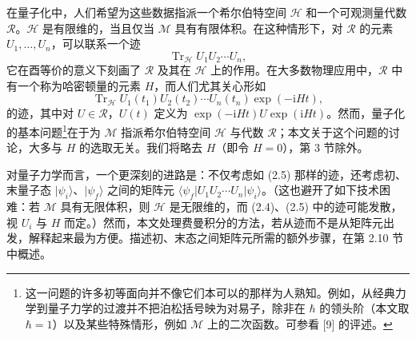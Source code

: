 \documentclass[11pt,a4paper,UTF8]{ctexart}
\theoremstyle{plain}
\theoremstyle{definition}
\begin{document}
在量子化中，人们希望为这些数据指派一个希尔伯特空间 $\mathcal{H}$ 和一个可观测量代数 $\mathcal{R}$。$\mathcal{H}$ 是有限维的，当且仅当 $\mathcal{M}$ 具有有限体积。在这种情形下，对 $\mathcal{R}$ 的元素 $U_1,\dots,U_n$，可以联系一个迹
\begin{equation}
    \operatorname{Tr}_{\mathcal{H}}U_1U_2\cdots U_n,
    \tag{2.4}
\end{equation}
它在酉等价的意义下刻画了 $\mathcal{R}$ 及其在 $\mathcal{H}$ 上的作用。在大多数物理应用中，$\mathcal{R}$ 中有一个称为哈密顿量的元素 $H$，而人们尤其关心形如
\begin{equation}
    \operatorname{Tr}_{\mathcal{H}}U_1(t_1)U_2(t_2)\cdots U_n(t_n)\exp(-\mathrm{i}Ht),
    \tag{2.5}
\end{equation}
的迹，其中对 $U\in\mathcal{R}$，$U(t)$ 定义为 $\exp(-\mathrm{i}Ht)U\exp(\mathrm{i}Ht)$。然而，量子化的基本问题\footnote{这一问题的许多初等面向并不像它们本可以的那样为人熟知。例如，从经典力学到量子力学的过渡并不把泊松括号映为对易子，除非在 $\hbar$ 的领头阶（本文取 $\hbar=1$）以及某些特殊情形，例如 $\mathcal{M}$ 上的二次函数。可参看 [9] 的评述。}在于为 $\mathcal{M}$ 指派希尔伯特空间 $\mathcal{H}$ 与代数 $\mathcal{R}$；本文关于这个问题的讨论，大多与 $H$ 的选取无关。我们将略去 $H$（即令 $H=0$），第 3 节除外。



对量子力学而言，一个更深刻的进路是：不仅考虑如 (2.5) 那样的迹，还考虑初、末量子态 $|\psi_i\rangle$、$|\psi_f\rangle$ 之间的矩阵元 $\langle\psi_f|U_1U_2\cdots U_n|\psi_i\rangle$。（这也避开了如下技术困难：若 $\mathcal{M}$ 具有无限体积，则 $\mathcal{H}$ 是无限维的，而 (2.4)、(2.5) 中的迹可能发散，视 $U_i$ 与 $H$ 而定。）然而，本文处理费曼积分的方法，若从迹而不是从矩阵元出发，解释起来最为方便。描述初、末态之间矩阵元所需的额外步骤，在第 2.10 节中概述。
\end{document}
